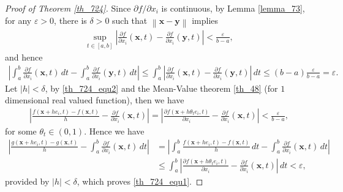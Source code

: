 \documentclass[11pt]{book}
\theoremstyle{definition}
\numberwithin{equation}{chapter}
\begin{document}
\begin{proof}[Proof of Theorem \ref{th_724}]
Since $\partial f/\partial x_i$ is continuous, by Lemma \ref{lemma_73}, for any $\varepsilon > 0$, there is $\delta > 0$ such that $\left\|\mathbf{x} - \mathbf{y}\right\|$ implies
\begin{align}\label{th_724_equ2}
    \sup_{t\in[a,b]} \left|\frac{\partial f}{\partial x_i}(\mathbf{x},t) - \frac{\partial f}{\partial x_i}(\mathbf{y},t)\right| < \frac{\varepsilon}{b - a},
\end{align}
and hence
\begin{align*}
    \left|\int^b_a \frac{\partial f}{\partial x_i}(\mathbf{x},t) \,dt - \int^b_a \frac{\partial f}{\partial x_i}(\mathbf{y},t) \,dt\right| \leq \int^b_a \left|\frac{\partial f}{\partial x_i}(\mathbf{x},t) - \frac{\partial f}{\partial x_i}(\mathbf{y},t)\right| \,dt \leq (b-a) \frac{\varepsilon}{b - a} = \varepsilon.
\end{align*}
Let $\left|h\right| < \delta$, by \eqref{th_724_equ2} and the Mean-Value theorem \ref{th_48} (for $1$ dimensional real valued function), then we have
\begin{align*}
    \left|\frac{f(\mathbf{x} + he_i,t) - f(\mathbf{x},t)}{h} - \frac{\partial f}{\partial x_i}(\mathbf{x},t)\right| = \left|\frac{\partial f(\mathbf{x} + h \theta_t e_i,t)}{\partial x_i} - \frac{\partial f}{\partial x_i}(\mathbf{x},t)\right| < \frac{\varepsilon}{b - a},
\end{align*}
for some $\theta_t \in (0,1)$. Hence we have
\begin{align*}
    \left|\frac{g(\mathbf{x} + he_i,t) - g(\mathbf{x},t)}{h} - \int^b_a \frac{\partial f}{\partial x_i}(\mathbf{x},t) \,dt\right| & = \left|\int^b_a \frac{f(\mathbf{x} + he_i,t) - f(\mathbf{x},t)}{h} \,dt - \int^b_a \frac{\partial f}{\partial x_i}(\mathbf{x},t) \,dt\right| \\
    & \leq \int^b_a \left|\frac{\partial f(\mathbf{x} + h \theta_t e_i,t)}{\partial x_i} - \frac{\partial f}{\partial x_i}(\mathbf{x},t)\right| \,dt < \varepsilon,
\end{align*}
provided by $\left|h\right| < \delta$, which proves \eqref{th_724_equ1}.
\end{proof}

\medskip
\end{document}
